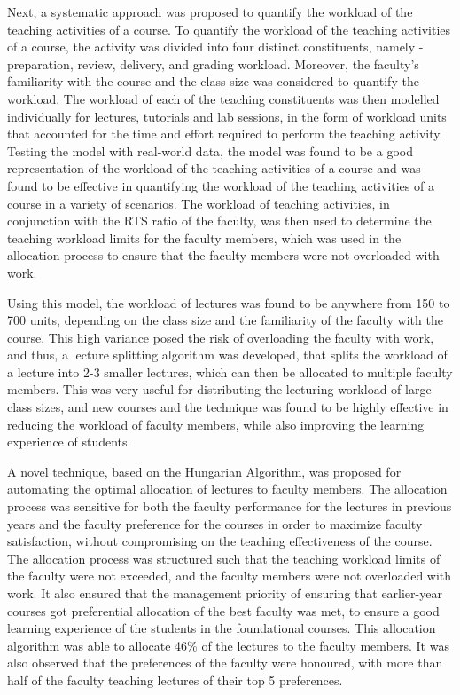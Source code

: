 Next, a systematic approach was proposed to quantify the workload of the teaching activities of a course. To quantify the workload of the teaching activities of a course, the activity was divided into four distinct constituents, namely - preparation, review, delivery, and grading workload. Moreover, the faculty's familiarity with the course and the class size was considered to quantify the workload. The workload of each of the teaching constituents was then modelled individually for lectures, tutorials and lab sessions, in the form of workload units that accounted for the time and effort required to perform the teaching activity. Testing the model with real-world data, the model was found to be a good representation of the workload of the teaching activities of a course and was found to be effective in quantifying the workload of the teaching activities of a course in a variety of scenarios. The workload of teaching activities, in conjunction with the RTS ratio of the faculty, was then used to determine the teaching workload limits for the faculty members, which was used in the allocation process to ensure that the faculty members were not overloaded with work.

Using this model, the workload of lectures was found to be anywhere from 150 to 700 units, depending on the class size and the familiarity of the faculty with the course. This high variance posed the risk of overloading the faculty with work, and thus, a lecture splitting algorithm was developed, that splits the workload of a lecture into 2-3 smaller lectures, which can then be allocated to multiple faculty members. This was very useful for distributing the lecturing workload of large class sizes, and new courses and the technique was found to be highly effective in reducing the workload of faculty members, while also improving the learning experience of students.

A novel technique, based on the Hungarian Algorithm, was proposed for automating the optimal allocation of lectures to faculty members. The allocation process was sensitive for both the faculty performance for the lectures in previous years and the faculty preference for the courses in order to maximize faculty satisfaction, without compromising on the teaching effectiveness of the course. The allocation process was structured such that the teaching workload limits of the faculty were not exceeded, and the faculty members were not overloaded with work. It also ensured that the management priority of ensuring that earlier-year courses got preferential allocation of the best faculty was met, to ensure a good learning experience of the students in the foundational courses. This allocation algorithm was able to allocate 46\% of the lectures to the faculty members. It was also observed that the preferences of the faculty were honoured, with more than half of the faculty teaching lectures of their top 5 preferences.

